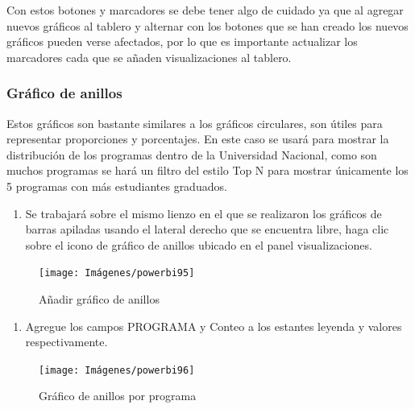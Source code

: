 \documentclass[
]{book}
\providecommand{\tightlist}{%
  \setlength{\itemsep}{0pt}\setlength{\parskip}{0pt}}
\begin{document}
Con estos botones y marcadores se debe tener algo de cuidado ya que al agregar nuevos gráficos al tablero y alternar con los botones que se han creado los nuevos gráficos pueden verse afectados, por lo que es importante actualizar los marcadores cada que se añaden visualizaciones al tablero.

\hypertarget{gruxe1ficoanillos}{%
\subsubsection{Gráfico de anillos}\label{gruxe1ficoanillos}}

Estos gráficos son bastante similares a los gráficos circulares, son útiles para representar proporciones y porcentajes. En este caso se usará para mostrar la distribución de los programas dentro de la Universidad Nacional, como son muchos programas se hará un filtro del estilo Top N para mostrar únicamente los 5 programas con más estudiantes graduados.

\begin{enumerate}
\def\labelenumi{\arabic{enumi}.}
\tightlist
\item
  Se trabajará sobre el mismo lienzo en el que se realizaron los gráficos de barras apiladas usando el lateral derecho que se encuentra libre, haga clic sobre el icono de gráfico de anillos ubicado en el panel visualizaciones.
\end{enumerate}

\begin{figure}

{\centering \texttt{[image: Imágenes/powerbi95]} 

}

\caption{Añadir gráfico de anillos}\label{fig:paso1anillos-fig}
\end{figure}

\begin{enumerate}
\def\labelenumi{\arabic{enumi}.}
\setcounter{enumi}{1}
\tightlist
\item
  Agregue los campos PROGRAMA y Conteo a los estantes leyenda y valores respectivamente.
\end{enumerate}

\begin{figure}

{\centering \texttt{[image: Imágenes/powerbi96]} 

}

\caption{Gráfico de anillos por programa}\label{fig:paso2anillos-fig}
\end{figure}
\end{document}
